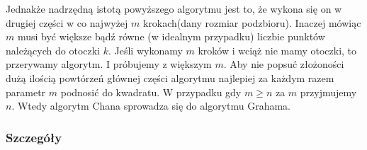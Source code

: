\documentclass[11pt]{article}
\theoremstyle{remark} \newtheorem{definition}{def.}
\theoremstyle{definition} \newtheorem{twierdzenie}{tw.}
\begin{document}
    Jednakże nadrzędną istotą powyższego algorytmu jest to, że wykona się on w drugiej
    części w co najwyżej $m$ krokach(dany rozmiar podzbioru). Inaczej mówiąc $m$ musi być
    większe bądź równe (w idealnym przypadku) liczbie punktów należących do otoczki $k$.
    Jeśli wykonamy $m$ kroków i wciąż nie mamy otoczki, to przerywamy algorytm. I 
    próbujemy z większym $m$. Aby nie popsuć złożoności dużą ilością powtórzeń głównej
    części algorytmu najlepiej za każdym razem parametr $m$ podnosić do kwadratu. W przypadku
    gdy $m \ge n$ za $m$ przyjmujemy $n$. Wtedy algorytm Chana sprowadza się do algorytmu 
    Grahama.
    \subsubsection{Szczegóły}  
\end{document}
